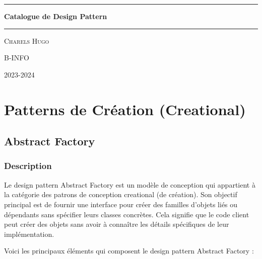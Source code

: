 \documentclass[french]{article}
\begin{document}
\begin{titlepage}
	\centering
    \vspace{2.5cm} 
    
    \noindent\rule{15cm}{0.4pt}
    \vspace{0.25cm} 
    {\huge\bfseries Catalogue de Design Pattern \par}
    \vspace{0.5cm}
    {\scshape\Large  \par}
    \vspace{0.5cm}
    \noindent\rule{15cm}{0.4pt}
    \vfill


	{\Large\scshape Charels Hugo \par}
	\vspace{0.5cm}
	{\Large\scshape B-INFO\par}
	\vspace{1cm}
	{\large 2023-2024 \par}
\end{titlepage}


\tableofcontents
\clearpage

\newpage

\section{Patterns de Création (Creational)}


\subsection{Abstract Factory}

\subsubsection{Description}

Le design pattern Abstract Factory est un modèle de conception qui appartient à la catégorie des patrons de conception creational (de création). Son objectif principal est de fournir une interface pour créer des familles d'objets liés ou dépendants sans spécifier leurs classes concrètes. Cela signifie que le code client peut créer des objets sans avoir à connaître les détails spécifiques de leur implémentation.

Voici les principaux éléments qui composent le design pattern Abstract Factory :
\end{document}
